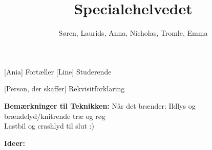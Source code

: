 \documentclass[a4paper,11pt]{article}
\title{Specialehelvedet}
\author{Søren, Laurids, Anna, Nicholas, Tromle, Emma}
\begin{document}
\maketitle

\begin{roles}
    [Ania] Fortæller
[Line] Studerende
\end{roles}

\begin{props}
    [Person, der skaffer] Rekvisitforklaring
\end{props}

\textbf{Bemærkninger til Teknikken:} Når det brænder: Ildlys og brændelyd/knitrende træ og røg \\Lastbil og crashlyd til slut :)

\vspace{0.3cm}

\textbf{Ideer:}
\end{document}
